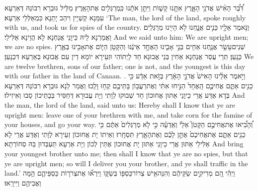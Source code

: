 {דִּ֠בֶּ֠ר הָאִ֨ישׁ אֲדֹנֵ֥י הָאָ֛רֶץ אִתָּ֖נוּ קָשׁ֑וֹת וַיִּתֵּ֣ן אֹתָ֔נוּ כִּֽמְרַגְּלִ֖ים אֶת\maqqaf הָאָֽרֶץ׃}
{מַלֵּיל גּוּבְרָא רִבּוֹנַהּ דְּאַרְעָא עִמַּנָא קַשְׁיָין וִיהַב יָתַנָא כִּמְאַלְּלֵי אַרְעָא׃}
{‘The man, the lord of the land, spoke roughly with us, and took us for spies of the country.}{}
{וַנֹּ֥אמֶר אֵלָ֖יו כֵּנִ֣ים אֲנָ֑חְנוּ לֹ֥א הָיִ֖ינוּ מְרַגְּלִֽים׃}
{וַאֲמַרְנָא לֵיהּ כֵּיוָנֵי אֲנַחְנָא לָא הֲוֵינָא אַלִּילֵי׃}
{And we said unto him: We are upright men; we are no spies.}{}
{שְׁנֵים\maqqaf עָשָׂ֥ר אֲנַ֛חְנוּ אַחִ֖ים בְּנֵ֣י אָבִ֑ינוּ הָאֶחָ֣ד אֵינֶ֔נּוּ וְהַקָּטֹ֥ן הַיּ֛וֹם אֶת\maqqaf אָבִ֖ינוּ בְּאֶ֥רֶץ כְּנָֽעַן׃}
{תְּרֵי עֲסַר אֲנַחְנָא אַחִין בְּנֵי אֲבוּנָא חַד לָיְתוֹהִי וּזְעֵירָא יוֹמָא דֵין עִם אֲבוּנָא בְּאַרְעָא דִּכְנָעַן׃}
{We are twelve brethren, sons of our father; one is not, and the youngest is this day with our father in the land of Canaan. .}{}
{וַיֹּ֣אמֶר אֵלֵ֗ינוּ הָאִישׁ֙ אֲדֹנֵ֣י הָאָ֔רֶץ בְּזֹ֣את אֵדַ֔ע כִּ֥י כֵנִ֖ים אַתֶּ֑ם אֲחִיכֶ֤ם הָֽאֶחָד֙ הַנִּ֣יחוּ אִתִּ֔י וְאֶת\maqqaf רַעֲב֥וֹן בָּתֵּיכֶ֖ם קְח֥וּ וָלֵֽכוּ׃}
{וַאֲמַר לַנָא גּוּבְרָא רִבּוֹנַהּ דְּאַרְעָא בְּדָא אֶדַּע אֲרֵי כֵיוָנֵי אַתּוּן אֲחוּכוֹן חַד שְׁבוּקוּ לְוָתִי וְיָת עֲבוּרָא דְּחַסִּיר בְּבָתֵּיכוֹן סַבוּ וְאִיזִילוּ׃}
{And the man, the lord of the land, said unto us: Hereby shall I know that ye are upright men: leave one of your brethren with me, and take corn for the famine of your houses, and go your way.}{}
{וְ֠הָבִ֠יאוּ אֶת\maqqaf אֲחִיכֶ֣ם הַקָּטֹן֮ אֵלַי֒ וְאֵֽדְעָ֗ה כִּ֣י לֹ֤א מְרַגְּלִים֙ אַתֶּ֔ם כִּ֥י כֵנִ֖ים אַתֶּ֑ם אֶת\maqqaf אֲחִיכֶם֙ אֶתֵּ֣ן לָכֶ֔ם וְאֶת\maqqaf הָאָ֖רֶץ תִּסְחָֽרוּ׃}
{וְאֵיתוֹ יָת אֲחוּכוֹן זְעֵירָא לְוָתִי וְאֶדַּע אֲרֵי לָא אַלִּילֵי אַתּוּן אֲרֵי כֵיוָנֵי אַתּוּן יָת אֲחוּכוֹן אֶתֵּין לְכוֹן וְיָת אַרְעָא תַּעְבְּדוּן בַּהּ סְחוֹרְתָא׃}
{And bring your youngest brother unto me; then shall I know that ye are no spies, but that ye are upright men; so will I deliver you your brother, and ye shall traffic in the land.’}{}
{וַיְהִ֗י הֵ֚ם מְרִיקִ֣ים שַׂקֵּיהֶ֔ם וְהִנֵּה\maqqaf אִ֥ישׁ צְרוֹר\maqqaf כַּסְפּ֖וֹ בְּשַׂקּ֑וֹ וַיִּרְא֞וּ אֶת\maqqaf צְרֹר֧וֹת כַּסְפֵּיהֶ֛ם הֵ֥מָּה וַאֲבִיהֶ֖ם וַיִּירָֽאוּ׃}
